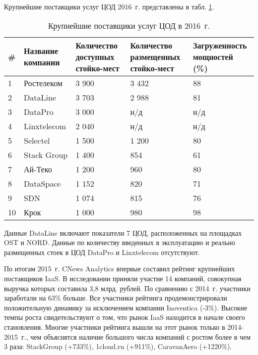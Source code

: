 Крупнейшие поставщики услуг ЦОД 2016~г. \cite{cnews} представлены в табл. \ref{dc-table}.
\begin{table}[H]
  \caption{Крупнейшие поставщики услуг ЦОД в 2016~г.}\label{dc-table}
  \begin{tabular}{|p{0.6cm}|p{2.6cm}|p{3cm}|p{3.5cm}|p{3.5cm}|}
  \hline \# & Название компании & Количество доступных стойко-мест & Количество размещенных стойко-мест & Загруженность мощностей (\%) \\
  \hline 1 & Ростелеком & 3 900 & 3 432 & 88 \\
  \hline 2 & DataLine & 3 703 & 2 988 & 81 \\
  \hline 3 & DataPro & 3 000 & н/д & н/д \\
  \hline 4 & Linxtelecom & 2 040 & н/д & н/д \\
  \hline 5 & Selectel & 1 500 & 1 200 & 80 \\
  \hline 6 & Stack Group & 1 400 & 854 & 61 \\
  \hline 7 & Ай-Теко & 1 200 & 960 & 80 \\
  \hline 8 & DataSpace & 1 152 & 820 & 71 \\
  \hline 9 & SDN & 1 074 & 815 & 76 \\
  \hline 10 & Крок & 1 000 & 980 & 98 \\
  \hline
  \end{tabular}
\end{table}

Данные DataLine включают показатели 7 ЦОД, расположенных на площадках OST и NORD.
Данные по количеству введенных в эксплуатацию и реально размещенных стоек в ЦОД DataPro и Linxtelecom отсутствуют.

По итогам 2015~г. CNews Analytics впервые составил рейтинг крупнейших поставщиков IaaS.
В исследовании приняли участие 14 компаний, совокупная выручка которых составила 3,8 млрд. рублей.
По сравнению с 2014~г. участники заработали на 63\% больше.
Все участники рейтинга продемонстрировали положительную динамику за исключением компании Inoventica (-3\%).
Высокие темпы роста свидетельствуют о том, что рынок IaaS находится в начале своего становления.
Многие участники рейтинга вышли на этот рынок только в 2014-2015~г., чем объяснятся наличие большого числа компаний с ростом более в чем 3 раза: StackGroup (+733\%), 1cloud.ru (+911\%), CaravanAero (+1220\%).

